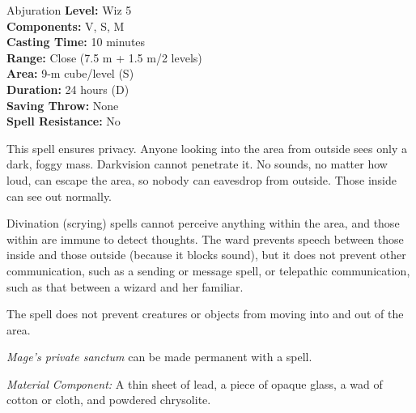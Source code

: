 {Abjuration}
{
	\textbf{Level:}
	Wiz 5\\
	\textbf{Components:}
	V, S, M\\
	\textbf{Casting Time:}
	10 minutes\\
	\textbf{Range:}
	Close (7.5 m + 1.5 m/2 levels)\\
	\textbf{Area:}
	9-m cube/level (S)\\
	\textbf{Duration:}
	24 hours (D)\\
	\textbf{Saving Throw:}
	None\\
	\textbf{Spell Resistance:}
	No\\
}
{
	This spell ensures privacy. Anyone looking into the area from outside sees only a dark, foggy mass. Darkvision cannot penetrate it. No sounds, no matter how loud, can escape the area, so nobody can eavesdrop from outside. Those inside can see out normally.

	Divination (scrying) spells cannot perceive anything within the area, and those within are immune to detect thoughts. The ward prevents speech between those inside and those outside (because it blocks sound), but it does not prevent other communication, such as a sending or message spell, or telepathic communication, such as that between a wizard and her familiar.

	The spell does not prevent creatures or objects from moving into and out of the area.

	\emph{Mage's private sanctum} can be made permanent with a  spell.

	\textit{Material Component:}
	A thin sheet of lead, a piece of opaque glass, a wad of cotton or cloth, and powdered chrysolite.

}
